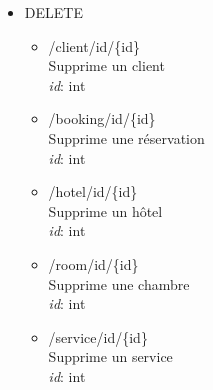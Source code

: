 \documentclass{article}
\begin{document}
\begin{itemize}
\begin{itemize}
	\item /hotel/id/\{id\}\\
		ajoute un nouvel h\^{o}tel \\
		\textit{id}: int

	\item /booking/id/\{booking\_id\}/service/id/\{service\_id\} \\
		Ajoute un service \`a une r\'eservation \\
		\textit{booking\_id}: int \\
		\textit{service\_id}: int
	\end{itemize}

\item DELETE
	\begin{itemize}
	\item /client/id/\{id\}\\
		Supprime un client \\
		\textit{id}: int

	\item /booking/id/\{id\}\\
		Supprime une r\'eservation \\
		\textit{id}: int

	\item /hotel/id/\{id\}\\
		Supprime un h\^{o}tel \\
		\textit{id}: int

	\item /room/id/\{id\}\\
		Supprime une chambre \\
		\textit{id}: int

	\item /service/id/\{id\}\\
		Supprime un service \\
		\textit{id}: int

	\end{itemize}
\end{itemize}
\end{document}
